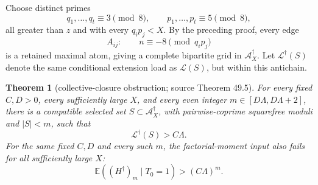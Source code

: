 \documentclass[10pt,reqno]{amsart}
\newtheorem{theorem}{Theorem}[section]
\theoremstyle{definition}
\newcommand{\1}{\mathbf 1}
\begin{document}
Choose distinct primes
\begin{equation}\tag{49.12}
 q_1,\ldots,q_t\equiv3\pmod8,
 \qquad p_1,\ldots,p_t\equiv5\pmod8,
\end{equation}
all greater than $z$ and with every $q_ip_j<X$.  By the preceding proof,
every edge
\begin{equation}\tag{49.13}
 A_{ij}:\qquad n\equiv-8\pmod {q_ip_j}
\end{equation}
is a retained maximal atom, giving a complete bipartite grid in
$\mathcal A_X^\dagger$.  Let $\mathcal L^\dagger(S)$ denote the same
conditional extension load as $\mathcal L(S)$, but within this antichain.
\begin{theorem}[collective-closure obstruction; source Theorem 49.5]
\label{thm:grid-obstruction}
For every fixed $C,D>0$, every sufficiently large $X$, and \emph{every}
even integer $m\in[D\Lambda,D\Lambda+2]$, there is a compatible selected
set $S\subset\mathcal A_X^\dagger$, with pairwise-coprime squarefree
moduli and $|S|<m$, such that
\begin{equation}\tag{49.14}
                         \mathcal L^\dagger(S)>C\Lambda.
\end{equation}
For the same fixed $C,D$ and every such $m$, the factorial-moment input also
fails for all sufficiently large $X$:
\begin{equation}\tag{49.15}
 \mathbb E((H^\dagger)_m\mid T_0=1)>(C\Lambda)^m.
\end{equation}
\end{theorem}
\end{document}

